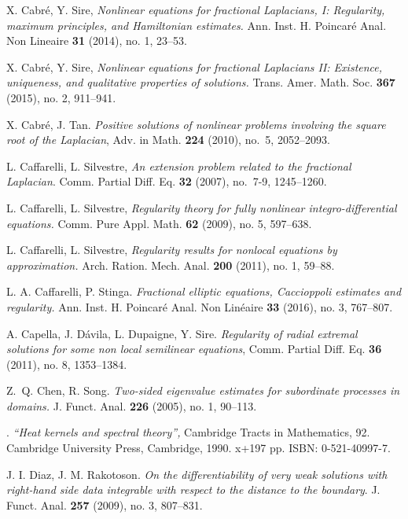 \documentclass[11pt]{article}
\numberwithin{equation}{section}
\begin{document}
\begin{thebibliography}{00}
 X. Cabr\'e, Y. Sire, \textit{Nonlinear equations for fractional Laplacians, I: Regularity, maximum principles, and Hamiltonian estimates. }Ann. Inst. H. Poincar\'e Anal. Non Lineaire {\bf 31} (2014), no. 1, 23--53.

 X. Cabr\'e, Y. Sire, \textit{Nonlinear equations for fractional Laplacians II: Existence, uniqueness, and qualitative properties of solutions. }Trans. Amer. Math. Soc. {\bf 367} (2015), no. 2, 911--941.

X. Cabr\'e, J. Tan. {\it Positive solutions of nonlinear problems involving the square root of the Laplacian}, Adv. in Math. \textbf{224} (2010), no.~5, 2052--2093.

 L. Caffarelli, L. Silvestre, \textit{An extension problem related to the fractional Laplacian}.  Comm. Partial Diff. Eq.  \textbf{32} (2007), no.~7-9, 1245--1260.

L. Caffarelli, L. Silvestre, \textit{Regularity theory for fully nonlinear integro-differential equations. }Comm. Pure Appl. Math. \textbf{62} (2009), no. 5, 597--638.

 L. Caffarelli, L. Silvestre, \textit{Regularity results for nonlocal equations by approximation. }Arch. Ration. Mech. Anal. \textbf{200} (2011), no. 1, 59--88.

 L. A. Caffarelli, P. Stinga. \textit{Fractional elliptic equations, Caccioppoli estimates and regularity. }Ann. Inst. H. Poincar\'e Anal. Non Lin\'eaire \textbf{33} (2016), no. 3, 767--807.


 A. Capella, J. D\'avila, L. Dupaigne, Y. Sire. \textit{Regularity of radial extremal solutions for some non local semilinear equations}, Comm. Partial Diff. Eq. \textbf{36} (2011), no. 8, 1353--1384.

Z.~Q. Chen, R. Song. \textit{Two-sided eigenvalue estimates for subordinate processes in domains. }J. Funct. Anal. \textbf{226} (2005), no. 1, 90--113.

. {\sl ``Heat kernels and spectral theory'',} Cambridge Tracts in Mathematics, 92. Cambridge University Press, Cambridge, 1990. x+197 pp. ISBN: 0-521-40997-7.

 J. I. Diaz, J. M. Rakotoson. \textit{On the differentiability of very weak solutions with right-hand side data integrable with respect to the distance to the boundary}. J. Funct. Anal. \textbf{257} (2009), no. 3, 807--831.


\end{thebibliography}
\end{document}

